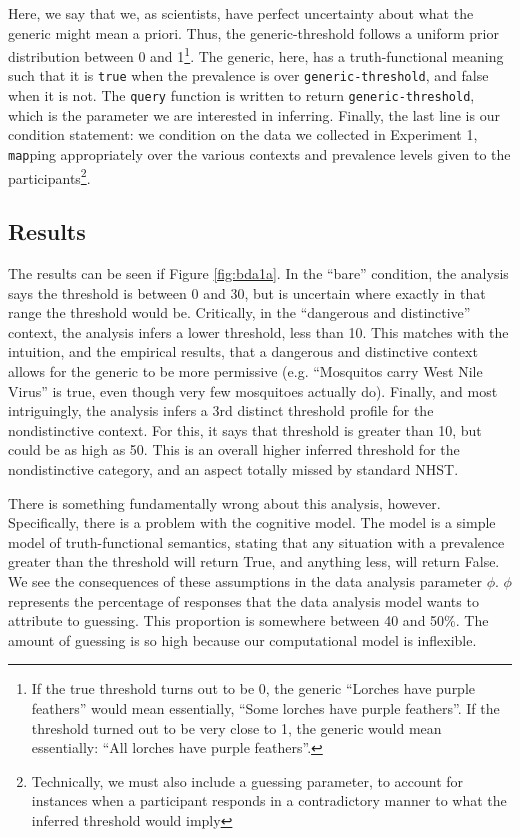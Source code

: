 \documentclass[10pt,letterpaper]{article}
\begin{document}
Here, we say that we, as scientists, have perfect uncertainty about what the generic might mean a priori. Thus, the generic-threshold follows a uniform prior distribution between 0 and 1\footnote{If the true threshold turns out to be 0, the generic ``Lorches have purple feathers'' would mean essentially, ``Some lorches have purple feathers''. If the threshold turned out to be very close to 1, the generic would mean essentially: ``All lorches have purple feathers''.}. The generic, here, has a truth-functional meaning such that it is \lstinline{true} when the prevalence is over \lstinline{generic-threshold}, and false when it is not. The \lstinline{query} function is written to return \lstinline{generic-threshold}, which is the parameter we are interested in inferring. Finally, the last line is our condition statement: we condition on the data we collected in Experiment 1, \lstinline{map}ping appropriately over the various contexts and prevalence levels given to the participants\footnote{Technically, we must also include a guessing parameter, to account for instances when a participant responds in a contradictory manner to what the inferred threshold would imply}. 

\subsection{Results}

The results can be seen if Figure \ref{fig:bda1a}. In the ``bare'' condition, the analysis says the threshold is between 0 and 30, but is uncertain where exactly in that range the threshold would be. Critically, in the ``dangerous and distinctive'' context, the analysis infers a lower threshold, less than 10. This matches with the intuition, and the empirical results, that a dangerous and distinctive context allows for the generic to be more permissive (e.g. ``Mosquitos carry West Nile Virus'' is true, even though very few mosquitoes actually do). Finally, and most intriguingly, the analysis infers a 3rd distinct threshold profile for the nondistinctive context.  For this, it says that threshold is greater than 10, but could be as high as 50. This is an overall higher inferred threshold for the nondistinctive category, and an aspect totally missed by standard NHST. 

There is something fundamentally wrong about this analysis, however. Specifically, there is a problem with the cognitive model. The model is a simple model of truth-functional semantics, stating that any situation with a prevalence greater than the threshold will return True, and anything less, will return False. We see the consequences of these assumptions in the data analysis parameter $\phi$. $\phi$ represents the percentage of responses that the data analysis model wants to attribute to guessing. This proportion is somewhere between 40 and 50\%. The amount of guessing is so high because our computational model is inflexible.
\end{document}
